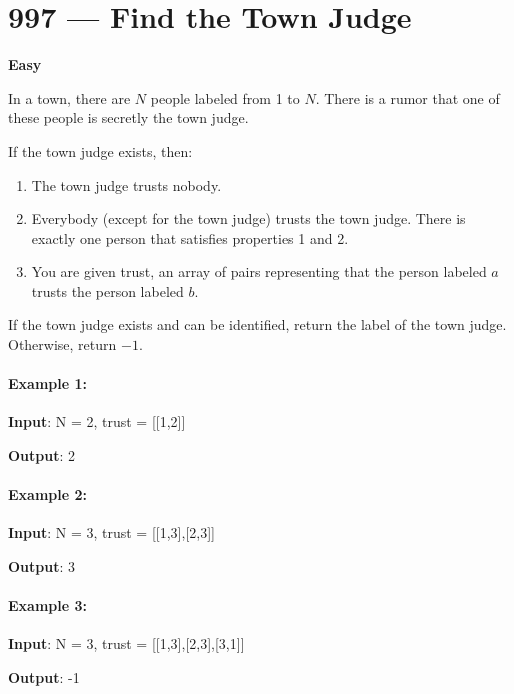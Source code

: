 \section{997 --- Find the Town Judge}

\textbf{Easy}

In a town, there are $N$ people labeled from 1 to $N$.  There is a rumor that one of these people is secretly the town judge.

If the town judge exists, then:



\begin{enumerate}
\item The town judge trusts nobody.
\item Everybody (except for the town judge) trusts the town judge.
There is exactly one person that satisfies properties 1 and 2.
\item You are given trust, an array of pairs  representing that the person labeled $a$ trusts the person labeled $b$.
\end{enumerate}

If the town judge exists and can be identified, return the label of the town judge.  Otherwise, return $-1$.

 

\paragraph{Example 1:}

\begin{flushleft}
\textbf{Input}: N = 2, trust = [[1,2]]

\textbf{Output}: 2


\end{flushleft}


\paragraph{Example 2:}

\begin{flushleft}
\textbf{Input}: N = 3, trust = [[1,3],[2,3]]

\textbf{Output}: 3
\end{flushleft}

\paragraph{Example 3:}

\begin{flushleft}
\textbf{Input}: N = 3, trust = [[1,3],[2,3],[3,1]]

\textbf{Output}: -1
\end{flushleft}

